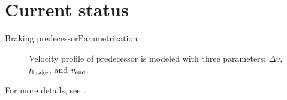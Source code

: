 \documentclass[aspectratio=\AspectR,10pt,compress,t]{beamer} %
\begin{document}
\section{Current status}
\begin{frame}{Braking predecessor}{Parametrization}
	\begin{figure}
		\centering
		
		\vspace{-0.5em}
		\caption{Velocity profile of predecessor is modeled with three parameters: $\Delta v$, $t_{\textup{brake}}$, and $v_{\textup{end}}$.}
	\end{figure}
	\vspace{-0.5em}
	\begin{flushright}
		For more details, see \cite{deGelder2017assessment}.
	\end{flushright}
\end{frame}
\end{document}
